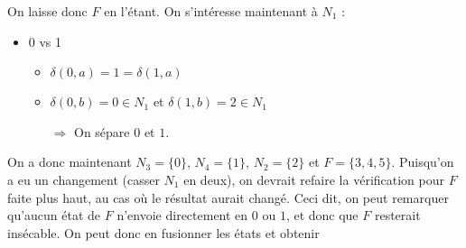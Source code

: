 \begin{correction*}
On laisse donc $F$ en l'étant. On s'intéresse maintenant à $N_1$ : 

\begin{itemize}
\item 0 vs 1
\begin{itemize}
\item $\delta(0,a) = 1 = \delta(1,a)$
\item $\delta(0,b) = 0 \in N_1$ et $\delta(1,b) = 2 \in N_1$
\item[$\Rightarrow$] On sépare $0$ et $1$.
\end{itemize}
\end{itemize}

On a donc maintenant $N_3 = \{0\}$, $N_4 = \{1\}$, $N_2 = \{2\}$ et $F = \{3,4,5\}$. Puisqu'on a eu un changement (casser $N_1$ en deux), on devrait refaire la vérification pour $F$ faite plus haut, au cas où le résultat aurait changé. Ceci dit, on peut remarquer qu'aucun état de $F$ n'envoie directement en $0$ ou $1$, et donc que $F$ resterait insécable. On peut donc en fusionner les états et obtenir 


\begin{figure}[!ht]
\centering
{}
\end{figure}

\end{correction*}


